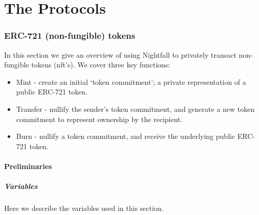 \documentclass{article}
\begin{document}
\newpage


\part{The Protocols}
\label{part:theProtocols}
\parttoc

\newpage
\section{ERC-721 (non-fungible) tokens}
\label{sec:721}
\secttoc
\mtcskip
\sectlof

\noindent
In this section we give an overview of using Nightfall to privately transact non-fungible tokens (nft's). We cover three key functions:
\begin{itemize}
  \item Mint - create an initial `token commitment'; a private representation of a public ERC-721 token.
  \item Transfer - nullify the sender's token commitment, and generate a new token commitment to represent ownership by the recipient.
  \item Burn - nullify a token commitment, and receive the underlying public ERC-721 token.
\end{itemize}

\subsection{Preliminaries}
\label{sec:721Preliminaries}



\newpage
\subsubsection{Variables}
Here we describe the variables used in this section.
\end{document}
